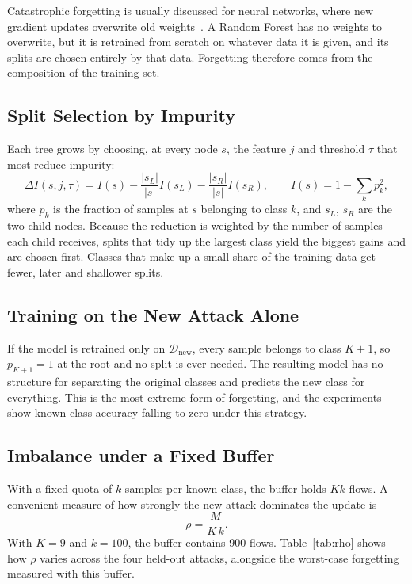 Catastrophic forgetting is usually discussed for neural networks, where new gradient updates overwrite old weights~\cite{kirkpatrick2017overcoming}. A Random Forest has no weights to overwrite, but it is retrained from scratch on whatever data it is given, and its splits are chosen entirely by that data. Forgetting therefore comes from the composition of the training set.

\subsection{Split Selection by Impurity}
\label{subsec:gini}

Each tree grows by choosing, at every node $s$, the feature $j$ and threshold $\tau$ that most reduce impurity:
\begin{equation}
\Delta I(s, j, \tau) = I(s) - \frac{|s_L|}{|s|} I(s_L) - \frac{|s_R|}{|s|} I(s_R), \qquad I(s) = 1 - \sum_{k} p_k^2 ,
\end{equation}
where $p_k$ is the fraction of samples at $s$ belonging to class $k$, and $s_L$, $s_R$ are the two child nodes. Because the reduction is weighted by the number of samples each child receives, splits that tidy up the largest class yield the biggest gains and are chosen first. Classes that make up a small share of the training data get fewer, later and shallower splits.

\subsection{Training on the New Attack Alone}
\label{subsec:finetune_only}

If the model is retrained only on $\mathcal{D}_{\text{new}}$, every sample belongs to class $K+1$, so $p_{K+1} = 1$ at the root and no split is ever needed. The resulting model has no structure for separating the original classes and predicts the new class for everything. This is the most extreme form of forgetting, and the experiments show known-class accuracy falling to zero under this strategy.

\subsection{Imbalance under a Fixed Buffer}
\label{subsec:imbalance_ratio}

With a fixed quota of $k$ samples per known class, the buffer holds $Kk$ flows. A convenient measure of how strongly the new attack dominates the update is
\begin{equation}
\rho = \frac{M}{K\,k}.
\end{equation}
With $K = 9$ and $k = 100$, the buffer contains 900 flows. Table~\ref{tab:rho} shows how $\rho$ varies across the four held-out attacks, alongside the worst-case forgetting measured with this buffer.


